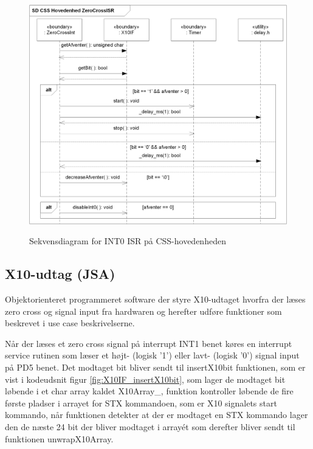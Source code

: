 \begin{figure}[!htb]
     {\includegraphics[width=\textwidth]{billeder/uml/CSS_ZeroCrossInt_SD}}
     \caption{Sekvensdiagram for INT0 ISR på CSS-hovedenheden}
     \label{fig:ZeroCrossISR}
\end{figure}

\subsection{X10-udtag (JSA)}

Objektorienteret programmeret software der styre X10-udtaget hvorfra der læses zero cross og signal input fra hardwaren og herefter udføre funktioner som beskrevet i use case beskrivelserne.

Når der læses et zero cross signal på interrupt INT1 benet køres en interrupt service rutinen som læser et højt- (logisk '1') eller lavt- (logisk '0') signal input på PD5 benet. Det modtaget bit bliver sendt til insertX10bit funktionen, som er vist i kodeudsnit figur \ref{fig:X10IF_insertX10bit}, som lager de modtaget bit løbende i et char array kaldet X10Array\_, funktion kontroller løbende de fire første pladser i arrayet for STX kommandoen, som er X10 signalets start kommando, når funktionen detekter at der er modtaget en STX kommando lager den de næste 24 bit der bliver modtaget i array\'et som derefter bliver sendt til funktionen unwrapX10Array. 

